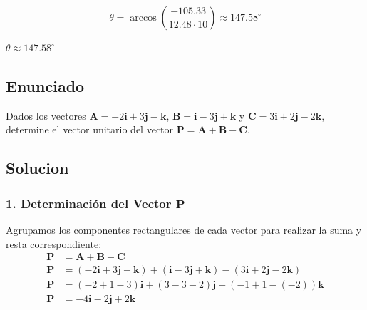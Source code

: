 \documentclass[12pt, a4paper]{article}
\begin{document}
$$\theta = \arccos\left( \frac{-105.33}{12.48 \cdot 10} \right) \approx 147.58^\circ$$

\begin{tcolorbox}[colback=green!5, colframe=green!50!black, title=Respuesta Final]
\centering \Large $\theta \approx 147.58^\circ$
\end{tcolorbox}

\newpage

\subsection*{Enunciado}
Dados los vectores $\mathbf{A} = -2\mathbf{i} + 3\mathbf{j} - \mathbf{k}$, $\mathbf{B} = \mathbf{i} - 3\mathbf{j} + \mathbf{k}$ y $\mathbf{C} = 3\mathbf{i} + 2\mathbf{j} - 2\mathbf{k}$, determine el vector unitario del vector $\mathbf{P} = \mathbf{A} + \mathbf{B} - \mathbf{C}$.

\begin{center}
\end{center}

\subsection*{Solucion}

\subsubsection*{1. Determinación del Vector $\mathbf{P}$}
Agrupamos los componentes rectangulares de cada vector para realizar la suma y resta correspondiente:
\begin{align*}
    \mathbf{P} &= \mathbf{A} + \mathbf{B} - \mathbf{C} \\
    \mathbf{P} &= (-2\mathbf{i} + 3\mathbf{j} - \mathbf{k}) + (\mathbf{i} - 3\mathbf{j} + \mathbf{k}) - (3\mathbf{i} + 2\mathbf{j} - 2\mathbf{k}) \\
    \mathbf{P} &= (-2 + 1 - 3)\mathbf{i} + (3 - 3 - 2)\mathbf{j} + (-1 + 1 - (-2))\mathbf{k} \\
    \mathbf{P} &= -4\mathbf{i} - 2\mathbf{j} + 2\mathbf{k}
\end{align*}
\end{document}
